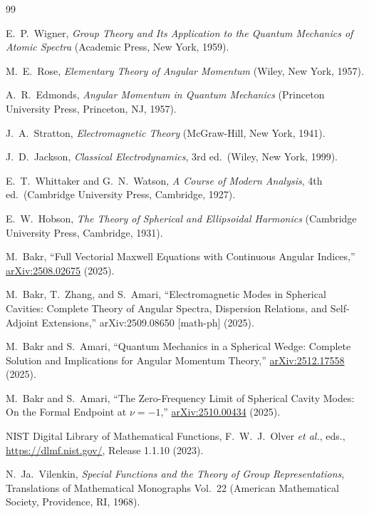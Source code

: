 \documentclass[
  aip,
  amsmath,amssymb,
  preprint
]{revtex4-1}
\begin{document}
\begin{thebibliography}{99}

E.~P.~Wigner, \textit{Group Theory and Its Application to the Quantum Mechanics of Atomic Spectra} (Academic Press, New York, 1959).

M.~E.~Rose, \textit{Elementary Theory of Angular Momentum} (Wiley, New York, 1957).

A.~R.~Edmonds, \textit{Angular Momentum in Quantum Mechanics} (Princeton University Press, Princeton, NJ, 1957).

J.~A.~Stratton, \textit{Electromagnetic Theory} (McGraw-Hill, New York, 1941).

J.~D.~Jackson, \textit{Classical Electrodynamics}, 3rd ed.\ (Wiley, New York, 1999).

E.~T.~Whittaker and G.~N.~Watson, \textit{A Course of Modern Analysis}, 4th ed.\ (Cambridge University Press, Cambridge, 1927).

E.~W.~Hobson, \textit{The Theory of Spherical and Ellipsoidal Harmonics} (Cambridge University Press, Cambridge, 1931).

M.~Bakr,
``Full Vectorial Maxwell Equations with Continuous Angular Indices,'' \href{https://arxiv.org/abs/2508.02675}{arXiv:2508.02675} (2025).

M.~Bakr, T.~Zhang, and S.~Amari,
``Electromagnetic Modes in Spherical Cavities: Complete Theory of Angular Spectra, Dispersion Relations, and Self-Adjoint Extensions,''
arXiv:2509.08650 [math-ph] (2025).

M.~Bakr and S.~Amari, ``Quantum Mechanics in a Spherical Wedge: Complete Solution and Implications for Angular Momentum Theory,''
\href{https://arxiv.org/abs/2512.17558}{arXiv:2512.17558} (2025).

M.~Bakr and S.~Amari, ``The Zero-Frequency Limit of Spherical Cavity Modes: On the Formal Endpoint at $\nu=-1$,''
\href{https://arxiv.org/abs/2510.00434}{arXiv:2510.00434} (2025).

NIST Digital Library of Mathematical Functions, F.~W.~J.~Olver \textit{et al.}, eds., \url{https://dlmf.nist.gov/}, Release 1.1.10 (2023).

N.~Ja.~Vilenkin, \textit{Special Functions and the Theory of Group Representations}, Translations of Mathematical Monographs Vol.~22 (American Mathematical Society, Providence, RI, 1968).


\end{thebibliography}
\end{document}
